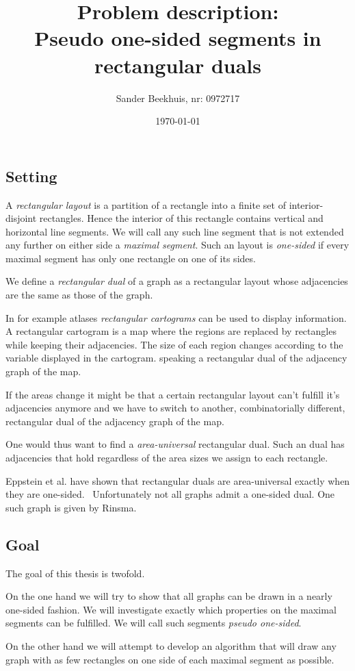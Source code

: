 \documentclass[a4paper]{article}
\title{Problem description:\\ Pseudo one-sided segments in rectangular duals}
\author{Sander Beekhuis, nr: 0972717}
\date{\today} %
\begin{document}
\maketitle

\subsection*{Setting}
A  \emph{rectangular layout} is a partition of a rectangle into a finite set of interior-disjoint rectangles. Hence the interior of this rectangle contains vertical and horizontal line segments. We will call any such line segment that is not extended any further on either side a \emph{maximal segment}. Such an layout is \emph{one-sided} if every maximal segment has only one rectangle on one of its sides.
 
We define a \emph{rectangular dual} of a graph as a rectangular layout whose adjacencies are the same as those of the graph.

In for example atlases \emph{rectangular cartograms} can be used to display information. A rectangular cartogram is a map where the regions are replaced by rectangles while keeping their adjacencies. The size of each region changes according to the variable displayed in the cartogram.   speaking a rectangular dual of the adjacency graph of the map.

If the areas change it might be that a certain rectangular layout can't fulfill it's adjacencies anymore and we have to switch to another, combinatorially different, rectangular dual of the adjacency graph of the map. 

One would thus want to find a \emph{area-universal} rectangular dual. Such an dual has adjacencies that hold regardless of the area sizes we assign to  each rectangle. 


Eppstein et al. have shown that rectangular duals are area-universal exactly when they are one-sided.~\cite{Eppstein2012} Unfortunately not all graphs admit a one-sided dual. One such graph is given by Rinsma.~\cite{Rinsma1987} 

\subsection*{Goal}
The goal of this thesis is twofold.

On the one hand we will try to show that all graphs can be drawn in a nearly one-sided fashion. We will investigate exactly which properties on the {maximal segments} can be fulfilled. We will call such segments \emph{pseudo one-sided}.

On the other hand we will attempt to develop an algorithm that will draw any graph with as few rectangles on one side of each {maximal segment} as possible.

\printbibliography
\end{document}
